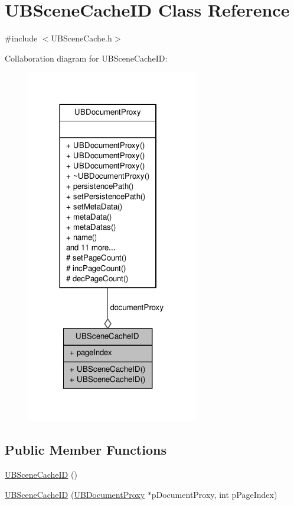 \hypertarget{class_u_b_scene_cache_i_d}{\section{U\-B\-Scene\-Cache\-I\-D Class Reference}
\label{dc/d7c/class_u_b_scene_cache_i_d}
}


{\ttfamily \#include $<$U\-B\-Scene\-Cache.\-h$>$}



Collaboration diagram for U\-B\-Scene\-Cache\-I\-D\-:
\nopagebreak
\begin{figure}[H]
\begin{center}
\leavevmode
\includegraphics[width=213pt]{de/d21/class_u_b_scene_cache_i_d__coll__graph}
\end{center}
\end{figure}
\subsection*{Public Member Functions}
\begin{DoxyCompactItemize}
\item 
\hyperlink{class_u_b_scene_cache_i_d_a89d42159a864ed3da46adbfe5424490b}{U\-B\-Scene\-Cache\-I\-D} ()
\item 
\hyperlink{class_u_b_scene_cache_i_d_a6b1ddc4c727c515079e3c31c4a9d573e}{U\-B\-Scene\-Cache\-I\-D} (\hyperlink{class_u_b_document_proxy}{U\-B\-Document\-Proxy} $\ast$p\-Document\-Proxy, int p\-Page\-Index)
\end{DoxyCompactItemize}
